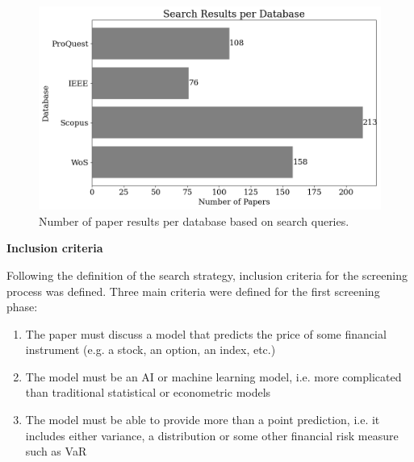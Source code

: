 \begin{figure}[H]
    \centering
    \includegraphics[width=1\linewidth]{Images/search_sample_by_database.png}
    \caption{Number of paper results per database based on search queries.}
    \label{fig:search_sample_by_database}
\end{figure}



\textbf{Inclusion criteria}\nopagebreak

Following the definition of the search strategy, inclusion criteria for the screening process was defined. Three main criteria were defined for the first screening phase:

\begin{enumerate}
    \item The paper must discuss a model that predicts the price of some financial instrument (e.g. a stock, an option, an index, etc.)
    \item The model must be an AI or machine learning model, i.e. more complicated than traditional statistical or econometric models
    \item The model must be able to provide more than a point prediction, i.e. it includes either variance, a distribution or some other financial risk measure such as VaR
\end{enumerate}


